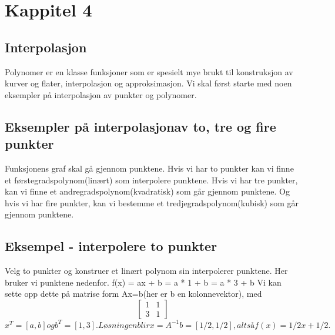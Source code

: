 \documentclass[a4paper,norsk]{article}
\begin{document}
\section{Kappitel 4}
\subsection{Interpolasjon}
Polynomer er en klasse funksjoner som er spesielt mye brukt til konstruksjon av kurver og flater, interpolasjon og approksimasjon. Vi skal først starte med noen eksempler på interpolasjon av punkter og polynomer.
\subsection{Eksempler på interpolasjonav to, tre og fire punkter}
Funksjonens graf skal gå gjennom punktene. Hvis vi har to punkter kan vi finne et førstegradspolynom(linært) som interpolere punktene. Hvis vi har tre punkter, kan vi finne et andregradspolynom(kvadratisk) som går gjennom punktene. Og hvis vi har fire punkter, kan vi bestemme et tredjegradspolynom(kubisk) som går gjennom punktene.\newline
\subsection{Eksempel - interpolere to punkter}
Velg to punkter og konstruer et linært polynom sin interpolerer punktene. Her bruker vi punktene nedenfor.\newline
 f(x) = ax + b  = a * 1 + b  = a * 3 + b \newline
\newline Vi kan sette opp dette på matrise form Ax=b(her er b en kolonnevektor), med 
\begin{equation*}\begin{bmatrix}1 &1\\3 & 1\end{bmatrix}\end{equation*}
\newline
\(x^T = [a, b] og b^T = [1, 3]. Løsningen blir x = A^{-1}b = [1/2, 1/2], altså f(x) = 1/2x + 1/2.\)\newline
\end{document}
